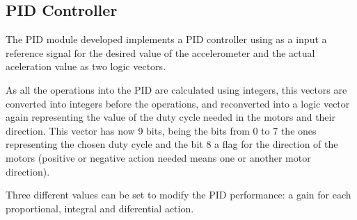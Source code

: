 \subsection{PID Controller}

The PID module developed implements a PID controller using as a input a reference signal for the desired value of the accelerometer and the actual aceleration value as two logic vectors.

As all the operations into the PID are calculated using integers, this vectors are converted into integers before the operations, and reconverted into a logic vector again representing the value of the duty cycle needed in the motors and their direction.
This vector has now 9 bits, being the bits from 0 to 7 the ones representing the chosen duty cycle and the bit 8 a flag for the direction of the motors (positive or negative action needed means one or another motor direction).

Three different values can be set to modify the PID performance: a gain for each proportional, integral and diferential action.
